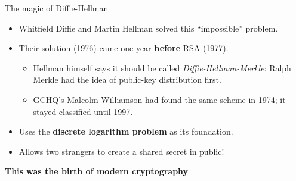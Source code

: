 \ifdefined\PRESENTATION\else\PassOptionsToClass{handout}{beamer}\fi\documentclass[aspectratio=169, lualatex]{beamer}
\begin{document}
\begin{frame}{The magic of Diffie-Hellman}
	\begin{itemize}[<+->]
		\item Whitfield Diffie and Martin Hellman solved this ``impossible'' problem.
		\item Their solution (1976) came one year \textbf{before} RSA (1977).
		      \begin{itemize}
			      \item Hellman himself says it should be called \emph{Diffie-Hellman-Merkle}: Ralph Merkle had the idea of public-key distribution first.
			      \item GCHQ's Malcolm Williamson had found the same scheme in 1974; it stayed classified until 1997.
		      \end{itemize}
		\item Uses the \textbf{discrete logarithm problem} as its foundation.
		\item Allows two strangers to create a shared secret in public!
	\end{itemize}
	\vspace{0.3cm}
	\begin{center}
		\Large\textbf{This was the birth of modern cryptography}
	\end{center}
\end{frame}
\end{document}
